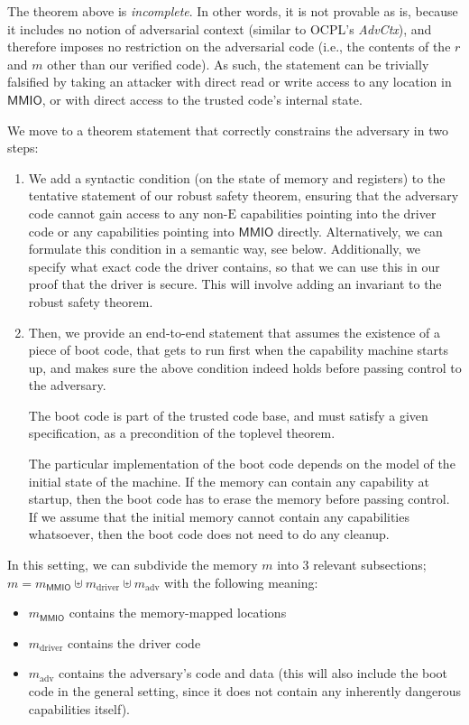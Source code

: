 \documentclass{article}
\newcommand{\X}[1]{\ensuremath{\mathrm{#1}}}
\newcommand{\Sf}[1]{\ensuremath{\mathsf{#1}}}
\newcommand{\MMIO}{\Sf{MMIO}\xspace}
\begin{document}
\medskip

The theorem above is \emph{incomplete}. In other words, it is not provable as
is, because it includes no notion of adversarial context (similar to OCPL's
\textit{AdvCtx}), and therefore imposes no restriction on the adversarial code
(i.e., the contents of the $r$ and $m$ other than our verified code).
%
As such, the statement can be trivially falsified by taking an attacker with
direct read or write access to any location in \MMIO, or with direct access to
the trusted code's internal state.

We move to a theorem statement that correctly constrains the adversary in two
steps:
%
\begin{enumerate}
  \item We add a syntactic condition (on the state of memory and registers) to
    the tentative statement of our robust safety theorem, ensuring that the
    adversary code cannot gain access to any non-$\X{E}$ capabilities pointing into
    the driver code or any capabilities pointing into $\MMIO$ directly.
    Alternatively, we can formulate this condition in a semantic way, see below.
    Additionally, we specify what exact code the driver contains, so that we can
    use this in our proof that the driver is secure. This will involve adding an
    invariant to the robust safety theorem.
%
  \item Then, we provide an end-to-end statement that assumes the existence of a
    piece of boot code, that gets to run first when the capability machine
    starts up, and makes sure the above condition indeed holds before passing
    control to the adversary.

    The boot code is part of the trusted code base, and must satisfy a given
    specification, as a precondition of the toplevel theorem.

    The particular implementation of the boot code depends on the model of the
    initial state of the machine. If the memory can contain any capability at
    startup, then the boot code has to erase the memory before passing control.
    If we assume that the initial memory cannot contain any capabilities
    whatsoever, then the boot code does not need to do any cleanup.
\end{enumerate}

In this setting, we can subdivide the memory $m$ into 3 relevant subsections;
$m = m_{\MMIO} \uplus m_{\X{driver}} \uplus m_{\X{adv}}$ %
with the following meaning:
\begin{itemize}
\item $m_{\MMIO}$ contains the memory-mapped locations
\item $m_{\X{driver}}$ contains the driver code
\item  $m_{\X{adv}}$ contains the adversary's code and data (this will also
  include the boot code in the general setting, since it does not contain any
  inherently dangerous capabilities itself).
\end{itemize}
\end{document}
